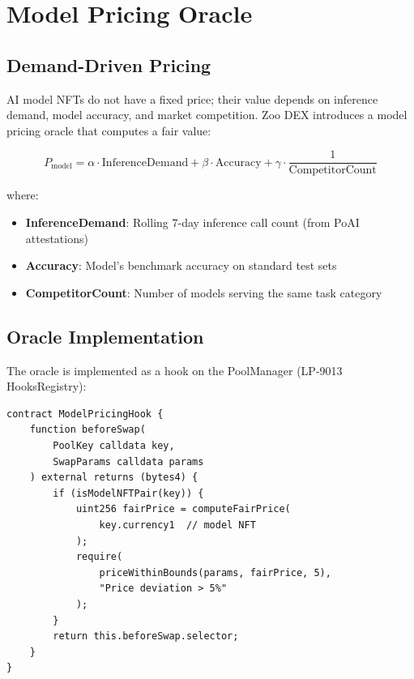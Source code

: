 \section{Model Pricing Oracle}

\label{sec:oracle}

\subsection{Demand-Driven Pricing}

AI model NFTs do not have a fixed price; their value depends on inference demand, model accuracy, and market competition. Zoo DEX introduces a model pricing oracle that computes a fair value:

\begin{equation}
P_{\text{model}} = \alpha \cdot \text{InferenceDemand} + \beta \cdot \text{Accuracy} + \gamma \cdot \frac{1}{\text{CompetitorCount}}
\end{equation}

where:
\begin{itemize}
    \item \textbf{InferenceDemand}: Rolling 7-day inference call count (from PoAI attestations)
    \item \textbf{Accuracy}: Model's benchmark accuracy on standard test sets
    \item \textbf{CompetitorCount}: Number of models serving the same task category
\end{itemize}

\subsection{Oracle Implementation}

The oracle is implemented as a hook on the PoolManager (LP-9013 HooksRegistry):

\begin{lstlisting}[basicstyle=\ttfamily\small,caption=Model Pricing Oracle Hook]
contract ModelPricingHook {
    function beforeSwap(
        PoolKey calldata key,
        SwapParams calldata params
    ) external returns (bytes4) {
        if (isModelNFTPair(key)) {
            uint256 fairPrice = computeFairPrice(
                key.currency1  // model NFT
            );
            require(
                priceWithinBounds(params, fairPrice, 5),
                "Price deviation > 5%"
            );
        }
        return this.beforeSwap.selector;
    }
}
\end{lstlisting}

